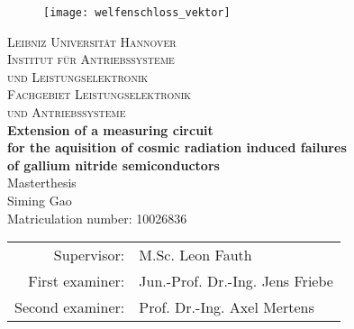 \begin{titlepage}
\enlargethispage{2.0cm}

\begin{center}

\vspace*{-2cm}
   \begin{figure}[h]
   \centering
       \texttt{[image: welfenschloss\_vektor]}
   \end{figure}

\vspace{1cm}

    {\LARGE \textsc{Leibniz Universität Hannover}}\\[1.0cm]

    {\Large \textsc{Institut für Antriebssysteme}} \\[0.2cm]
    {\Large \textsc{und Leistungselektronik}} \\ [0.4cm]

    {\Large \textsc{Fachgebiet Leistungselektronik}} \\ [0.2cm]
		{\Large \textsc{und Antriebssysteme}} \\ [1.7cm]

    {\Large \textbf{Extension of a measuring circuit \\[0.3cm] for the aquisition of cosmic radiation induced failures\\[0.3cm] of  gallium nitride semiconductors} } \\ [3cm]
    {\Large Masterthesis} \\ [1.5cm]

    {\large Siming Gao} \\
    {Matriculation number: 10026836 } \\ [1.5cm]

    \begin{tabular}{rl}
      Supervisor:    & M.Sc. Leon Fauth\\
      First examiner:  & Jun.-Prof. Dr.-Ing. Jens Friebe\\
      Second examiner: & Prof. Dr.-Ing. Axel Mertens
    \end{tabular}
\end{center}
\end{titlepage}
